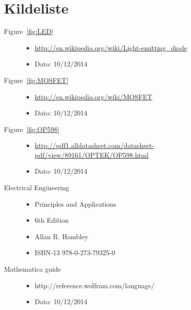 \section{Kildeliste}

\begin{description}
	\item[Figure~\ref{fig:LED}] \hfill
		\begin{itemize}
			\item \url{http://en.wikipedia.org/wiki/Light-emitting_diode}
			\item Dato: 10/12/2014
		\end{itemize}
	\item[Figure~\ref{fig:MOSFET}] \hfill
		\begin{itemize}
			\item \url{http://en.wikipedia.org/wiki/MOSFET}
			\item Dato: 10/12/2014
		\end{itemize}
	\item[Figure~\ref{fig:OP598}] \hfill
		\begin{itemize}
			\item \url{http://pdf1.alldatasheet.com/datasheet-pdf/view/89161/OPTEK/OP598.html}
			\item Dato: 10/12/2014
		\end{itemize}
	\item[Electrical Engineering] \hfill
		\begin{itemize}
			\item Principles and Applications
			\item 6th Edition
			\item Allan R. Hambley
			\item ISBN-13 978-0-273-79325-0
		\end{itemize}
	\item[Mathematica guide] \hfill
		\begin{itemize}
			\item http://reference.wolfram.com/language/
			\item Dato: 10/12/2014
		\end{itemize}
\end{description}

